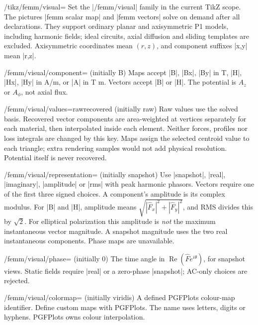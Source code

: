 \begin{key}{/tikz/femm/visual=}
Set the |/femm/visual| family in the current TikZ scope. The pictures
|femm scalar map| and |femm vectors| solve on demand after all declarations.
They support ordinary planar and axisymmetric P1 models, including harmonic
fields; ideal circuits, axial diffusion and sliding templates are excluded.
Axisymmetric coordinates mean $(r,z)$, and component suffixes |x,y| mean |r,z|.
\end{key}
\begin{key}{/femm/visual/component= (initially B)}
Maps accept |B|, |Bx|, |By| in T, |H|, |Hx|, |Hy| in A/m, or |A| in T m.
Vectors accept |B| or |H|. The potential is $A_z$ or $A_\phi$, not axial flux.
\end{key}
\begin{key}{/femm/visual/values=raw\textbar recovered (initially raw)}
Raw values use the solved basis. Recovered vector components are area-weighted
at vertices separately for each material, then interpolated inside each element.
Neither forces, profiles nor loss integrals are changed by this key.
Maps assign the selected centroid value to each triangle; extra rendering
samples would not add physical resolution. Potential itself is never recovered.
\end{key}
\begin{key}{/femm/visual/representation= (initially snapshot)}
Use |snapshot|, |real|, |imaginary|, |amplitude| or |rms| with peak harmonic
phasors. Vectors require one of the first three signed choices. A component's
amplitude is its complex modulus. For |B| and |H|, amplitude means
$\sqrt{|\widehat F_x|^2+|\widehat F_y|^2}$, and RMS divides this by $\sqrt2$.
For elliptical polarization this amplitude is \emph{not} the maximum
instantaneous vector magnitude. A snapshot magnitude uses the two real
instantaneous components. Phase maps are unavailable.
\end{key}
\begin{key}{/femm/visual/phase= (initially 0)}
The time angle in $\operatorname{Re}(\widehat F e^{i\theta})$, for snapshot views.
Static fields require |real| or a zero-phase |snapshot|; AC-only choices are rejected.
\end{key}
\begin{key}{/femm/visual/colormap= (initially viridis)}
A defined PGFPlots colour-map identifier. Define custom maps with PGFPlots.
The name uses letters, digits or hyphens. PGFPlots owns colour interpolation.
\end{key}
